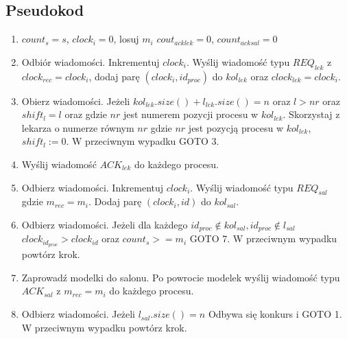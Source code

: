 \documentclass{article}
\begin{document}
\subsection{Pseudokod}
\begin{enumerate}
\item $count_{s} = s$, $clock_{i} = 0$, losuj $m_{i}$ $cout_{acklek} = 0$, $count_{acksal} = 0$
\item Odbiór wiadomości. Inkrementuj $clock_i$. Wyślij wiadomość typu $REQ_{lek}$ z $clock_{rec} = clock_i$, dodaj parę $(clock_{i}, id_{proc})$ do $kol_{lek}$ oraz $clock_{lek} = clock_i$.
\item Obierz wiadomości. Jeżeli $kol_{lek}.size() + l_{lek}.size() = n$ oraz $l > nr$ oraz $shift_l = l$ oraz gdzie $nr$ jest numerem pozycji procesu w $kol_{lek}$. Skorzystaj z lekarza o numerze równym $nr$ gdzie $nr$ jest pozycją procesu w $kol_{lek}$, $shift_l := 0$. W przeciwnym wypadku GOTO 3.
\item Wyślij wiadomość $ACK_{lek}$ do każdego procesu.
\item Odbierz wiadomości. Inkrementuj $clock_i$. Wyślij wiadomość typu $REQ_{sal}$ gdzie $m_{rec} = m_i$. Dodaj parę $(clock_i, id)$ do $kol_{sal}$.
\item Odbierz wiadomości. Jeżeli dla każdego $id_{proc} \not\in kol_{sal}, id_{proc} \not\in l_{sal}$ $clock_{id_{proc}} > clock_{id}$ oraz $count_{s} >= m_{i}$ GOTO 7. W przeciwnym wypadku powtórz krok.
\item Zaprowadź modelki do salonu. Po powrocie modelek wyślij wiadomość typu $ACK_{sal}$ z $m_{rec} = m_i$ do każdego procesu.
\item Odbierz wiadomości. Jeżeli $l_{sal}.size() = n$ Odbywa się konkurs i GOTO 1. W przeciwnym wypadku powtórz krok.
\end{enumerate}
\end{document}
